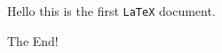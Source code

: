 \documentclass[12pt]{article}
\begin{document}
Hello this is 
the first {\tt \Huge \LaTeX} document.

The End!
\end{document}
